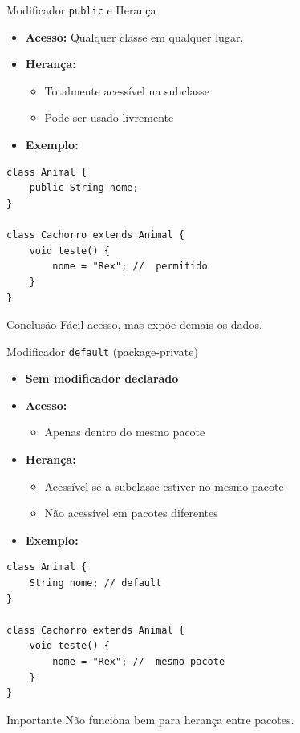 \documentclass[9pt]{beamer}
\begin{document}
\begin{frame}[fragile]{Modificador \texttt{public} e Herança}
\begin{itemize}
    \item \textbf{Acesso:} Qualquer classe em qualquer lugar.
    
    \item \textbf{Herança:}
    \begin{itemize}
        \item  Totalmente acessível na subclasse
        \item  Pode ser usado livremente
    \end{itemize}

    \item \textbf{Exemplo:}
\end{itemize}

\begin{lstlisting}
class Animal {
    public String nome;
}

class Cachorro extends Animal {
    void teste() {
        nome = "Rex"; //  permitido
    }
}
\end{lstlisting}

\begin{block}{Conclusão}
Fácil acesso, mas expõe demais os dados.
\end{block}
\end{frame}
\begin{frame}[fragile]{Modificador \texttt{default} (package-private)}
\begin{itemize}
    \item \textbf{Sem modificador declarado}
    
    \item \textbf{Acesso:}
    \begin{itemize}
        \item  Apenas dentro do mesmo pacote
    \end{itemize}

    \item \textbf{Herança:}
    \begin{itemize}
        \item Acessível se a subclasse estiver no mesmo pacote
        \item  Não acessível em pacotes diferentes
    \end{itemize}

    \item \textbf{Exemplo:}
\end{itemize}

\begin{lstlisting}
class Animal {
    String nome; // default
}

class Cachorro extends Animal {
    void teste() {
        nome = "Rex"; //  mesmo pacote
    }
}
\end{lstlisting}

\begin{alertblock}{Importante}
Não funciona bem para herança entre pacotes.
\end{alertblock}
\end{frame}
\end{document}
